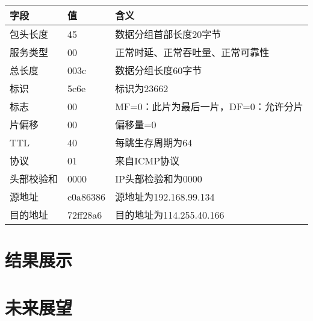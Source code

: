 \documentclass[a4paper, 11pt, oneside]{book} %
\numberwithin{equation}{subsection}
\begin{document}
	\begin{table}[H]
		\centering
		\begin{tabular}{lll}
			\hline
			字段 & 值 & 含义 \\ \hline
			包头长度 & 45 & 数据分组首部长度20字节 \\ \hline
			服务类型 & 00 & 正常时延、正常吞吐量、正常可靠性 \\ \hline
			总长度 & 003c & 数据分组长度60字节 \\ \hline
			标识 & 5c6e & 标识为23662 \\ \hline
			标志 & 00 & MF=0：此片为最后一片，DF=0：允许分片 \\ \hline
			片偏移 & 00 & 偏移量=0 \\ \hline
			TTL & 40 & 每跳生存周期为64 \\ \hline
			协议 & 01 & 来自ICMP协议 \\ \hline
			头部校验和 & 0000 & IP头部检验和为0000 \\ \hline
			源地址 & c0a86386 & 源地址为192.168.99.134 \\ \hline
			目的地址 & 72ff28a6 & 目的地址为114.255.40.166 \\ \hline
		\end{tabular}
	\end{table}
	
	\section{结果展示}
	
	\section{未来展望}
	
\end{document}
